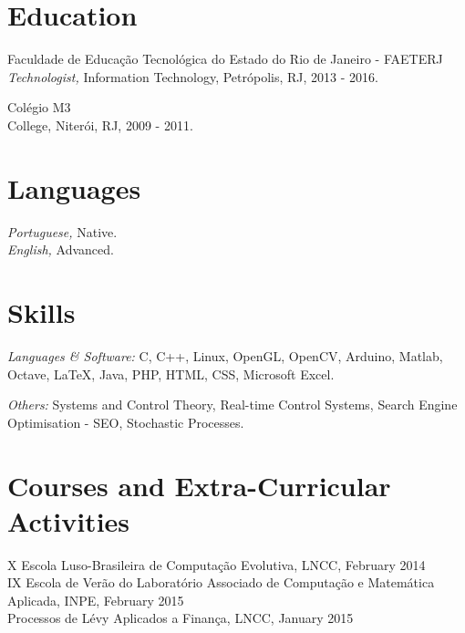 \documentclass[margin, 10pt]{res} %
\begin{document}
\begin{resume}
\section{Education}

Faculdade de Educação Tecnológica do Estado do Rio de Janeiro - FAETERJ \\
{\sl Technologist,} Information Technology, Petrópolis, RJ, 2013 - 2016.

Colégio M3 \\
College, Niterói, RJ, 2009 - 2011.
 

\section{Languages}
{\sl Portuguese,} Native.\\
{\sl English,} Advanced.


\section{Skills} 

{\sl Languages \& Software:} C, C++, Linux, OpenGL, OpenCV, Arduino, Matlab, Octave, LaTeX, Java, PHP, HTML, CSS, Microsoft Excel.

{\sl Others:} Systems and Control Theory, Real-time Control Systems, Search Engine Optimisation - SEO, Stochastic Processes.
 

\section{Courses and Extra-Curricular Activities} 
X Escola Luso-Brasileira de Computação Evolutiva, LNCC, February 2014\\
IX Escola de Verão do Laboratório Associado de Computação e Matemática Aplicada, INPE, February 2015\\
Processos de Lévy Aplicados a Finança, LNCC, January 2015\\


\end{resume}
\end{document}

